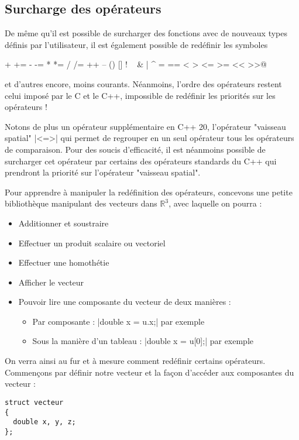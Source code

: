 \begin{itemize}
\subsection{Surcharge des opérateurs}

De même qu'il est possible de surcharger des fonctions avec de nouveaux types définis par l'utilisateur, il est également possible
de redéfinir les symboles 

\begin{center}
\verb@+ += - -= * *= / /= ++ -- () [] ! ~ & | ^ = == < > <= >= << >>@
\end{center} 

et d'autres encore, moins courants. Néanmoins, l'ordre 
des opérateurs restent celui imposé par le C et le C++, impossible de redéfinir les priorités sur les opérateurs !

Notons de plus un opérateur supplémentaire en C++ 20, l'opérateur "vaisseau spatial" |<=>| qui permet de regrouper en un seul opérateur tous les opérateurs de comparaison. Pour des soucis d'efficacité, il est néanmoins possible de surcharger cet opérateur par certains des opérateurs standards du C++ qui prendront la priorité sur l'opérateur "vaisseau spatial".

Pour apprendre à manipuler la redéfinition des opérateurs, concevons une petite bibliothèque manipulant des vecteurs dans $\mathbb{R}^{3}$, avec laquelle on pourra :
\begin{itemize}
  \item Additionner et soustraire
  \item Effectuer un produit scalaire ou vectoriel
  \item Effectuer une homothétie
  \item Afficher le vecteur
  \item Pouvoir lire une composante du vecteur de deux manières :
  \begin{itemize}
    \item Par composante : |double x = u.x;| par exemple
    \item Sous la manière d'un tableau : |double x = u[0];| par exemple
  \end{itemize}
\end{itemize}

On verra ainsi au fur et à mesure comment redéfinir certains opérateurs. Commençons par définir notre vecteur et la façon d'accéder aux composantes du vecteur :

\begin{lstlisting}[caption=définition d'un vecteur en trois dimensions]
struct vecteur
{
  double x, y, z;
};


\end{lstlisting}
\end{itemize}
